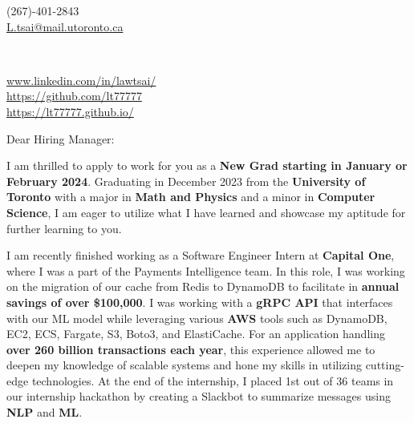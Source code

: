 \documentclass[10.5pt,a4]{article}
\begin{document}
\begin{center}
    \begin{minipage}[b]{0.24\textwidth}
            \large (267)-401-2843 \\
            \large \href{mailto:L.tsai@mail.utoronto.ca}{L.tsai@mail.utoronto.ca} 
    \end{minipage}%
    \begin{minipage}[b]{0.5\textwidth}
             \\ %
            \vspace{0.1cm}
            {\color{UI_blue} \Large{}}
    \end{minipage}%
    \begin{minipage}[b]{0.33\textwidth}
            \flushright \small
            {\href{www.linkedin.com/in/lawtsai/}{www.linkedin.com/in/lawtsai/} } \\
            \href{https://github.com/lt77777}{https://github.com/lt77777} \\
            \href{https://lt77777.github.io/}
            {https://lt77777.github.io/}
    \end{minipage}   
    
\vspace{-0.15cm} 
{\color{UI_blue} \hrulefill}
\end{center}

\justify
\setlength{\parindent}{0pt}
\setlength{\parskip}{12pt}
\vspace{0.2cm}




Dear Hiring Manager:

I am thrilled to apply to work for you as a \textbf{New Grad starting in January or February 2024}. Graduating in December 2023 from the \textbf{University of Toronto} with a major in \textbf{Math and Physics} and a minor in \textbf{Computer Science}, I am eager to utilize what I have learned and showcase my aptitude for further learning to you.

I am recently finished working as a Software Engineer Intern at \textbf{Capital One}, where I was a part of the Payments Intelligence team. In this role, I was working on the migration of our cache from Redis to DynamoDB to facilitate in \textbf{annual savings of over \$100,000}. I was working with a \textbf{gRPC API} that interfaces with our ML model while leveraging various \textbf{AWS} tools such as DynamoDB, EC2, ECS, Fargate, S3, Boto3, and ElastiCache. For an application handling \textbf{over 260 billion transactions each year}, this experience allowed me to deepen my knowledge of scalable systems and hone my skills in utilizing cutting-edge technologies. At the end of the internship, I placed 1st out of 36 teams in our internship hackathon 
by creating a Slackbot to summarize messages using \textbf{NLP} and \textbf{ML}.
\end{document}
